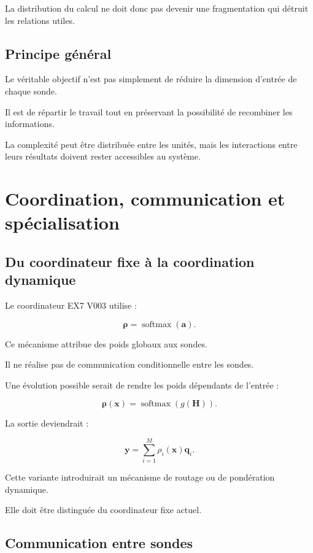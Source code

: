\documentclass[11pt,a4paper]{report}
\newcommand{\softmax}{\operatorname{softmax}}
\newcommand{\vect}[1]{\bm{#1}}
\begin{document}
La distribution du calcul ne doit donc pas devenir une
fragmentation qui détruit les relations utiles.

\section{Principe général}

Le véritable objectif n'est pas simplement de réduire
la dimension d'entrée de chaque sonde.

Il est de répartir le travail tout en préservant
la possibilité de recombiner les informations.

La complexité peut être distribuée entre les unités,
mais les interactions entre leurs résultats doivent
rester accessibles au système.

\chapter{Coordination, communication et spécialisation}

\section{Du coordinateur fixe à la coordination dynamique}

Le coordinateur EX7 V003 utilise :

\[
\vect{\rho}=\softmax(\vect{a}).
\]

Ce mécanisme attribue des poids globaux aux sondes.

Il ne réalise pas de communication conditionnelle entre
les sondes.

Une évolution possible serait de rendre les poids
dépendants de l'entrée :

\[
\vect{\rho}(\vect{x})
=
\softmax(g(\vect{H})).
\]

La sortie deviendrait :

\[
\vect{y}
=
\sum_{i=1}^{M}
\rho_i(\vect{x})\vect{q}_i.
\]

Cette variante introduirait un mécanisme de routage
ou de pondération dynamique.

Elle doit être distinguée du coordinateur fixe actuel.

\section{Communication entre sondes}
\end{document}
